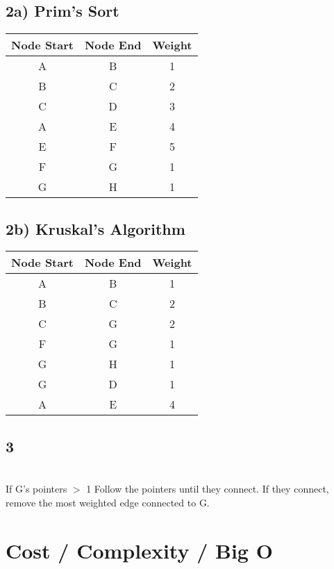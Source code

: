 \documentclass[12pt]{amsart}
\begin{document}
\subsection*{2a) Prim's Sort}
\begin{center}
\begin{tabular}{ | c | c | c |}
\hline
Node Start & Node End & Weight \\
\hline
\hline
A & B & 1 \\
\hline
B & C & 2 \\
\hline
C & D & 3 \\
\hline
A & E & 4 \\
\hline
E & F & 5 \\
\hline
F & G & 1 \\
\hline
G & H & 1 \\
\hline
\end{tabular}
\end{center}
\subsection*{2b) Kruskal's Algorithm}
\begin{center}
\begin{tabular}{ | c | c | c |}
\hline
Node Start & Node End & Weight \\
\hline
\hline
A & B & 1 \\
\hline
B & C & 2 \\
\hline
C & G & 2 \\
\hline
F & G & 1 \\
\hline
G & H & 1 \\
\hline
G & D & 1 \\
\hline
A & E & 4 \\
\hline
\end{tabular}
\end{center}
\leavevmode
\newline
\subsection*{3}
\leavevmode
\\
If G's pointers $>$ 1 \newline
Follow the pointers until they connect. If they connect, remove the most weighted edge connected to G.

\pagebreak
\section{Cost / Complexity  / Big O}
\end{document}
